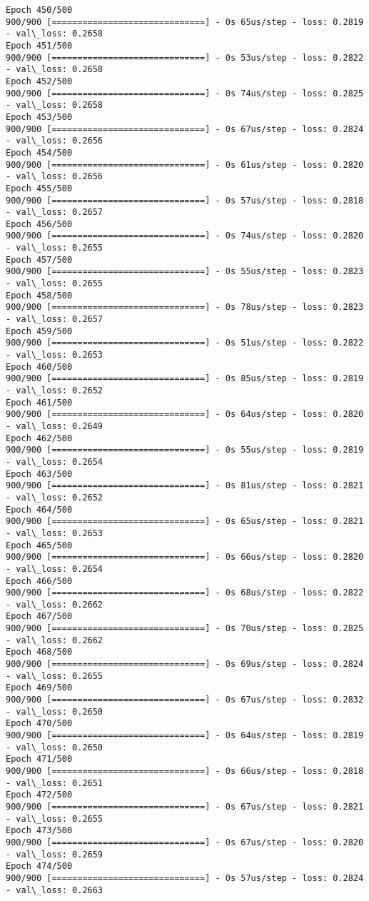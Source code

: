 \documentclass[11pt]{article}
\begin{document}
\begin{Verbatim}[commandchars=\\\{\}]
Epoch 450/500
900/900 [==============================] - 0s 65us/step - loss: 0.2819 - val\_loss: 0.2658
Epoch 451/500
900/900 [==============================] - 0s 53us/step - loss: 0.2822 - val\_loss: 0.2658
Epoch 452/500
900/900 [==============================] - 0s 74us/step - loss: 0.2825 - val\_loss: 0.2658
Epoch 453/500
900/900 [==============================] - 0s 67us/step - loss: 0.2824 - val\_loss: 0.2656
Epoch 454/500
900/900 [==============================] - 0s 61us/step - loss: 0.2820 - val\_loss: 0.2656
Epoch 455/500
900/900 [==============================] - 0s 57us/step - loss: 0.2818 - val\_loss: 0.2657
Epoch 456/500
900/900 [==============================] - 0s 74us/step - loss: 0.2820 - val\_loss: 0.2655
Epoch 457/500
900/900 [==============================] - 0s 55us/step - loss: 0.2823 - val\_loss: 0.2655
Epoch 458/500
900/900 [==============================] - 0s 78us/step - loss: 0.2823 - val\_loss: 0.2657
Epoch 459/500
900/900 [==============================] - 0s 51us/step - loss: 0.2822 - val\_loss: 0.2653
Epoch 460/500
900/900 [==============================] - 0s 85us/step - loss: 0.2819 - val\_loss: 0.2652
Epoch 461/500
900/900 [==============================] - 0s 64us/step - loss: 0.2820 - val\_loss: 0.2649
Epoch 462/500
900/900 [==============================] - 0s 55us/step - loss: 0.2819 - val\_loss: 0.2654
Epoch 463/500
900/900 [==============================] - 0s 81us/step - loss: 0.2821 - val\_loss: 0.2652
Epoch 464/500
900/900 [==============================] - 0s 65us/step - loss: 0.2821 - val\_loss: 0.2653
Epoch 465/500
900/900 [==============================] - 0s 66us/step - loss: 0.2820 - val\_loss: 0.2654
Epoch 466/500
900/900 [==============================] - 0s 68us/step - loss: 0.2822 - val\_loss: 0.2662
Epoch 467/500
900/900 [==============================] - 0s 70us/step - loss: 0.2825 - val\_loss: 0.2662
Epoch 468/500
900/900 [==============================] - 0s 69us/step - loss: 0.2824 - val\_loss: 0.2655
Epoch 469/500
900/900 [==============================] - 0s 67us/step - loss: 0.2832 - val\_loss: 0.2650
Epoch 470/500
900/900 [==============================] - 0s 64us/step - loss: 0.2819 - val\_loss: 0.2650
Epoch 471/500
900/900 [==============================] - 0s 66us/step - loss: 0.2818 - val\_loss: 0.2651
Epoch 472/500
900/900 [==============================] - 0s 67us/step - loss: 0.2821 - val\_loss: 0.2655
Epoch 473/500
900/900 [==============================] - 0s 67us/step - loss: 0.2820 - val\_loss: 0.2659
Epoch 474/500
900/900 [==============================] - 0s 57us/step - loss: 0.2824 - val\_loss: 0.2663

\end{Verbatim}
\end{document}
